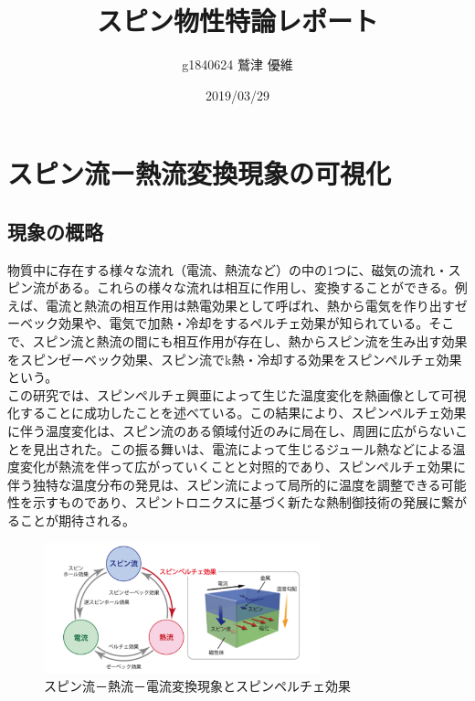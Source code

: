 \documentclass[10pt]{ujarticle}
\title{スピン物性特論レポート}
\author{g1840624 鷲津 優維}
\date{2019/03/29}
\begin{document}
\maketitle
\section{スピン流ー熱流変換現象の可視化}
\subsection{現象の概略}
物質中に存在する様々な流れ（電流、熱流など）の中の1つに、磁気の流れ・スピン流がある。これらの様々な流れは相互に作用し、変換することができる。例えば、電流と熱流の相互作用は熱電効果として呼ばれ、熱から電気を作り出すゼーベック効果や、電気で加熱・冷却をするペルチェ効果が知られている。そこで、スピン流と熱流の間にも相互作用が存在し、熱からスピン流を生み出す効果をスピンゼーベック効果、スピン流でk熱・冷却する効果をスピンペルチェ効果という。\\
この研究では、スピンペルチェ興亜によって生じた温度変化を熱画像として可視化することに成功したことを述べている。この結果により、スピンペルチェ効果に伴う温度変化は、スピン流のある領域付近のみに局在し、周囲に広がらないことを見出された。この振る舞いは、電流によって生じるジュール熱などによる温度変化が熱流を伴って広がっていくことと対照的であり、スピンペルチェ効果に伴う独特な温度分布の発見は、スピン流によって局所的に温度を調整できる可能性を示すものであり、スピントロニクスに基づく新たな熱制御技術の発展に繋がることが期待される。

\begin{figure}[h]
  \begin{center}
    \includegraphics[width=8cm]{./screenshot1.png}
    \caption{スピン流－熱流－電流変換現象とスピンペルチェ効果}
  \end{center}
\end{figure}
\end{document}
